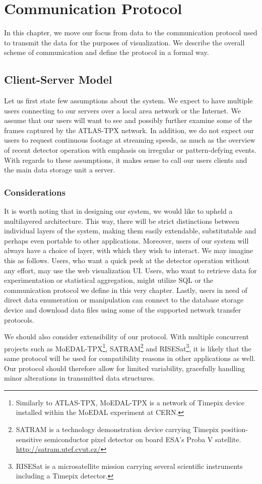 \chapter{Communication Protocol}

In this chapter, we move our focus from data to the communication protocol used to transmit the data for the purposes of visualization. We describe the overall scheme of communication and define the protocol in a formal way.

\section{Client-Server Model}
Let us first state few assumptions about the system. We expect to have multiple users connecting to our servers over a local area network or the Internet. We assume that our users will want to see and possibly further examine some of the frames captured by the ATLAS-TPX network. In addition, we do not expect our users to request continuous footage at streaming speeds, as much as the overview of recent detector operation with emphasis on irregular or pattern-defying events. With regards to these assumptions, it makes sense to call our users clients and the main data storage unit a server. 

\subsection{Considerations}
It is worth noting that in designing our system, we would like to upheld a multilayered architecture. This way, there will be strict distinctions between individual layers of the system, making them easily extendable, substitutable and perhaps even portable to other applications. Moreover, users of our system will always have a choice of layer, with which they wish to interact. We may imagine this as follows. Users, who want a quick peek at the detector operation without any effort, may use the web visualization UI. Users, who want to retrieve data for experimentation or statistical aggregation, might utilize SQL or the communication protocol we define in this very chapter. Lastly, users in need of direct data enumeration or manipulation can connect to the database storage device and download data files using some of the supported network transfer protocols.

We should also consider extensibility of our protocol. With multiple concurrent projects such as MoEDAL-TPX\footnote{Similarly to ATLAS-TPX, MoEDAL-TPX is a network of Timepix device installed within the MoEDAL experiment at CERN.}, SATRAM\footnote{SATRAM is a technology demonstration device carrying Timepix position-sensitive semiconductor pixel detector on board ESA’s Proba V satellite. \url{http://satram.utef.cvut.cz/}} and RISESat\footnote{RISESat is a microsatellite mission carrying several scientific instruments including a Timepix detector.}, it is likely that the same protocol will be used for compatibility reasons in other applications as well. Our protocol should therefore allow for limited variability, gracefully handling minor alterations in transmitted data structures.

